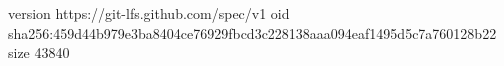 version https://git-lfs.github.com/spec/v1
oid sha256:459d44b979e3ba8404ce76929fbcd3c228138aaa094eaf1495d5c7a760128b22
size 43840
